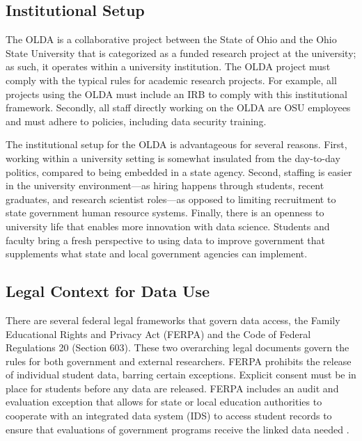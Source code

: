 \hypertarget{institutional-setup-1}{%
\subsection{Institutional Setup}\label{institutional-setup-1}}

The OLDA is a collaborative project between the State of Ohio and the Ohio State University that is categorized as a funded research project at the university; as such, it operates within a university institution. The OLDA project must comply with the typical rules for academic research projects. For example, all projects using the OLDA must include an IRB to comply with this institutional framework. Secondly, all staff directly working on the OLDA are OSU employees and must adhere to policies, including data security training.

The institutional setup for the OLDA is advantageous for several reasons. First, working within a university setting is somewhat insulated from the day-to-day politics, compared to being embedded in a state agency. Second, staffing is easier in the university environment---as hiring happens through students, recent graduates, and research scientist roles---as opposed to limiting recruitment to state government human resource systems. Finally, there is an openness to university life that enables more innovation with data science. Students and faculty bring a fresh perspective to using data to improve government that supplements what state and local government agencies can implement.

\hypertarget{legal-context-for-data-use-1}{%
\subsection{Legal Context for Data Use}\label{legal-context-for-data-use-1}}

There are several federal legal frameworks that govern data access, the Family Educational Rights and Privacy Act (FERPA) and the Code of Federal Regulations 20 (Section 603). These two overarching legal documents govern the rules for both government and external researchers. FERPA prohibits the release of individual student data, barring certain exceptions. Explicit consent must be in place for students before any data are released. FERPA includes an audit and evaluation exception that allows for state or local education authorities to cooperate with an integrated data system (IDS) to access student records to ensure that evaluations of government programs receive the linked data needed \citep{privacytechnicalassistancecenter2017}.

